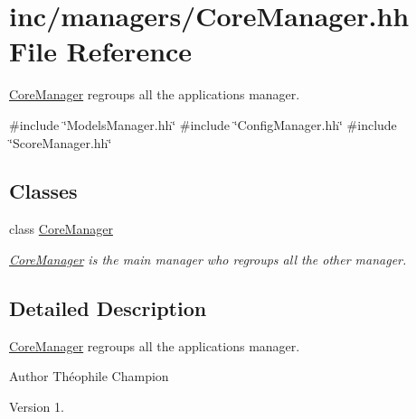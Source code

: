 \hypertarget{CoreManager_8hh}{}\section{inc/managers/\+Core\+Manager.hh File Reference}
\label{CoreManager_8hh}


\hyperlink{classCoreManager}{Core\+Manager} regroups all the application\textquotesingle{}s manager.  


{\ttfamily \#include \char`\"{}Models\+Manager.\+hh\char`\"{}}\newline
{\ttfamily \#include \char`\"{}Config\+Manager.\+hh\char`\"{}}\newline
{\ttfamily \#include \char`\"{}Score\+Manager.\+hh\char`\"{}}\newline
\subsection*{Classes}
\begin{DoxyCompactItemize}
\item 
class \hyperlink{classCoreManager}{Core\+Manager}
\begin{DoxyCompactList}\small\item\em \hyperlink{classCoreManager}{Core\+Manager} is the main manager who regroups all the other manager. \end{DoxyCompactList}\end{DoxyCompactItemize}


\subsection{Detailed Description}
\hyperlink{classCoreManager}{Core\+Manager} regroups all the application\textquotesingle{}s manager. 

\begin{DoxyAuthor}{Author}
Théophile Champion 
\end{DoxyAuthor}
\begin{DoxyVersion}{Version}
1. 
\end{DoxyVersion}
